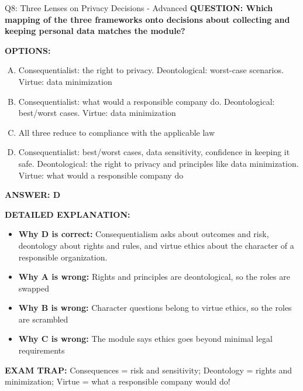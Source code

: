 \documentclass[8pt]{beamer}
\begin{document}
\begin{frame}[shrink=6]{Q8: Three Lenses on Privacy Decisions - Advanced}
\fontsize{6.5}{7.5}\selectfont
\textbf{QUESTION: Which mapping of the three frameworks onto decisions about collecting and keeping personal data matches the module?}

\vspace{0.1cm}
\textbf{OPTIONS:}
\begin{enumerate}[A.]
\item Consequentialist: the right to privacy. Deontological: worst-case scenarios. Virtue: data minimization
\item Consequentialist: what would a responsible company do. Deontological: best/worst cases. Virtue: data minimization
\item All three reduce to compliance with the applicable law
\item Consequentialist: best/worst cases, data sensitivity, confidence in keeping it safe. Deontological: the right to privacy and principles like data minimization. Virtue: what would a responsible company do
\end{enumerate}

\vspace{0.1cm}
\textcolor{myblue}{\textbf{ANSWER: D}}

\vspace{0.1cm}
\textbf{DETAILED EXPLANATION:}
\begin{itemize}
\item \textbf{Why D is correct:} Consequentialism asks about outcomes and risk, deontology about rights and rules, and virtue ethics about the character of a responsible organization.
\item \textbf{Why A is wrong:} Rights and principles are deontological, so the roles are swapped
\item \textbf{Why B is wrong:} Character questions belong to virtue ethics, so the roles are scrambled
\item \textbf{Why C is wrong:} The module says ethics goes beyond minimal legal requirements
\end{itemize}

\textcolor{myred}{\textbf{EXAM TRAP:}} Consequences = risk and sensitivity; Deontology = rights and minimization; Virtue = what a responsible company would do!
\end{frame}
\end{document}
